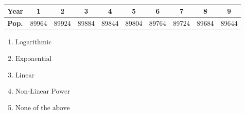 \documentclass[14pt]{extbook}
\begin{document}
\begin{enumerate}
{\begin{tabular}{c|c|c|c|c|c|c|c|c|c}
\textbf{Year} & 1 & 2 & 3 & 4 & 5 & 6 & 7 & 8 & 9 \tabularnewline
\hline
\textbf{Pop.} & 89964 & 89924 & 89884 & 89844 & 89804 & 89764 & 89724 & 89684 & 89644
\end{tabular} \begin{enumerate}[label=\Alph*.]
\item \( \text{Logarithmic} \)
\item \( \text{Exponential} \)
\item \( \text{Linear} \)
\item \( \text{Non-Linear Power} \)
\item \( \text{None of the above} \)

\end{enumerate} }
\end{enumerate}
\end{document}
